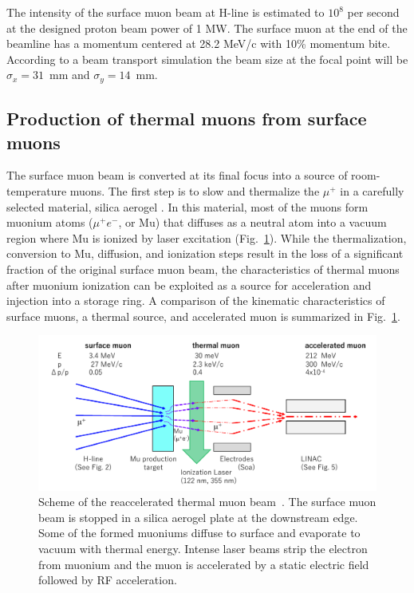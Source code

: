 The intensity of the surface muon beam at H-line is estimated 
to $10^8$ per second at the designed proton beam power of 1 MW.
The surface muon at the end of the beamline has a momentum centered at 28.2 MeV/c with 
10\% momentum bite. According to a beam transport simulation
the beam size at the focal point will be $\sigma_x=31$~mm and $\sigma_y=14$~mm.

\subsection{Production of thermal muons from surface muons} 
%
The surface muon beam is converted at its final focus into a
source of room-temperature muons. The first step is to
slow and thermalize the $\mu^{+}$ in a carefully selected
material, silica aerogel \cite{Tabata:2011aa}.  In this
material, most of the muons form muonium atoms ($\mu^{+}e^{-}$, or Mu)
that diffuses as a neutral atom into a vacuum region where Mu is
ionized by laser excitation (Fig.~\ref{fig:usm}). While the thermalization, conversion
to Mu, diffusion, and ionization steps result in the loss of a significant
fraction of the original surface muon beam, the
characteristics of thermal muons after muonium ionization can be
exploited as a source for acceleration and injection into a
storage ring. A comparison of the kinematic characteristics of
surface muons, a thermal source, and accelerated muon
is summarized in Fig.~\ref{fig:usm}.

\begin{figure}[t]
\centering
\includegraphics[width=1.0\columnwidth, bb=0 0 680 312]{Fig/muonbeam.pdf}
\caption{Scheme of the reaccelerated thermal muon beam~\cite{TDRsummarypaper}.
The surface muon beam is stopped in a silica aerogel plate at 
the downstream edge. Some of the formed muoniums diffuse to surface 
and evaporate to vacuum with thermal energy. 
Intense laser beams strip the electron from muonium 
and the muon is accelerated by a static electric field followed by 
RF acceleration. 
}
\label{fig:usm} 
\end{figure}

